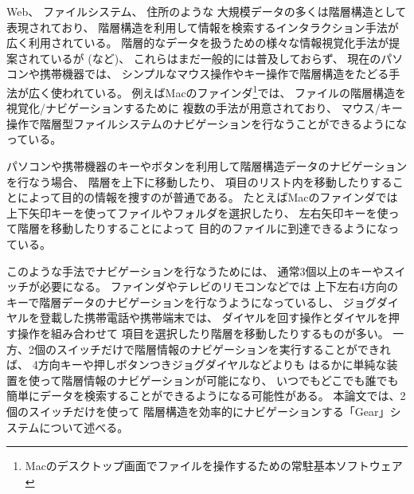 \documentclass[twoside]{wiss}
\def\GEAR{\textsf{Gear}}
\begin{document}
Web、
ファイルシステム、
住所のような
大規模データの多くは階層構造として表現されており、
%
%
%
%
%
%
%
階層構造を利用して情報を検索するインタラクション手法が広く利用されている。
階層的なデータを扱うための様々な情報視覚化手法が提案されているが
(\cite{Johnson:1991:TSA:949607.949654}\cite{Lamping:1995:FTB:223904.223956}\cite{Stasko:2000:FDN:857190.857683}など)、
これらはまだ一般的には普及しておらず、
現在のパソコンや携帯機器では、
シンプルなマウス操作やキー操作で階層構造をたどる手法が広く使われている。
%
例えばMacのファインダ\footnote{
  Macのデスクトップ画面でファイルを操作するための常駐基本ソフトウェア
}では、
ファイルの階層構造を視覚化/ナビゲーションするために
複数の手法が用意されており、
マウス/キー操作で階層型ファイルシステムのナビゲーションを行なうことができるようになっている。



パソコンや携帯機器のキーやボタンを利用して階層構造データのナビゲーションを行なう場合、
階層を上下に移動したり、
項目のリスト内を移動したりすることによって目的の情報を捜すのが普通である。
たとえばMacのファインダでは
上下矢印キーを使ってファイルやフォルダを選択したり、
左右矢印キーを使って階層を移動したりすることによって
目的のファイルに到達できるようになっている。


このような手法でナビゲーションを行なうためには、
通常3個以上のキーやスイッチが必要になる。
%
ファインダやテレビのリモコンなどでは
上下左右4方向のキーで階層データのナビゲーションを行なうようになっているし、
ジョグダイヤルを登載した携帯電話や携帯端末では、
ダイヤルを回す操作とダイヤルを押す操作を組み合わせて
項目を選択したり階層を移動したりするものが多い。
%
一方、2個のスイッチだけで階層情報のナビゲーションを実行することができれば、
4方向キーや押しボタンつきジョグダイヤルなどよりも
はるかに単純な装置を使って階層情報のナビゲーションが可能になり、
いつでもどこでも誰でも簡単にデータを検索することができるようになる可能性がある。
%
本論文では、2個のスイッチだけを使って
階層構造を効率的にナビゲーションする「{\GEAR}」システムについて述べる。
\end{document}
